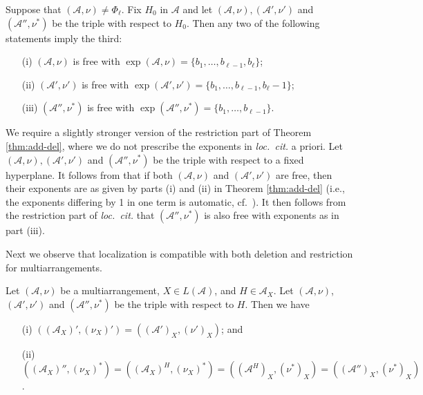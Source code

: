 \begin{theorem}
\label{thm:add-del}
Suppose that $({{\mathcal A}}, \nu) \ne \Phi_\ell$.
Fix $H_0$ in ${{\mathcal A}}$ and 
let  $({{\mathcal A}}, \nu), ({{\mathcal A}}', \nu')$ and  $({{\mathcal A}}'', \nu^*)$ be the triple with respect to $H_0$. 
Then any  two of the following statements imply the third:
\begin{itemize}
\item[(i)] $({{\mathcal A}}, \nu)$ is free with $\exp ({{\mathcal A}}, \nu) = \{ b_1, \ldots , b_{\ell -1}, b_\ell\}$;
\item[(ii)] $({{\mathcal A}}', \nu')$ is free with $\exp ({{\mathcal A}}', \nu') = \{ b_1, \ldots , b_{\ell -1}, b_\ell-1\}$;
\item[(iii)] $({{\mathcal A}}'', \nu^*)$ is free with $\exp ({{\mathcal A}}'', \nu^*) = \{ b_1, \ldots , b_{\ell -1}\}$.
\end{itemize}
\end{theorem}

\begin{remark}
\label{rem:restriction}
We require a 
slightly stronger version of the restriction part of 
Theorem \ref{thm:add-del}, where we 
do not prescribe the exponents in \emph{loc.\ cit.} a priori.
Let  $({{\mathcal A}}, \nu), ({{\mathcal A}}', \nu')$ and $({{\mathcal A}}'', \nu^*)$ 
be the triple with respect to a fixed hyperplane. 
It follows from \cite[Thm.\ 0.4]{abeteraowakefield:euler}
that if both $({{\mathcal A}}, \nu)$ and $({{\mathcal A}}', \nu')$ are free,
then their exponents are as given by parts (i) and (ii) in 
Theorem \ref{thm:add-del} 
(i.e., the exponents differing by 1 in one term is automatic,
cf.~\cite[Thm.\ 4.46]{orlikterao:arrangements}).
It then follows from the restriction part of \emph{loc.\ cit.}
that $({{\mathcal A}}'', \nu^*)$ is also free with exponents 
as in part (iii).
\end{remark}

Next we observe 
that localization is compatible 
with both deletion and restriction for multiarrangements. 

\begin{lemma}
\label{lem:euler}
Let $({{\mathcal A}}, \nu)$ be a multiarrangement, $X \in L({{\mathcal A}})$, and $H \in {{\mathcal A}}_X$.
Let $({{\mathcal A}}, \nu)$, $({{\mathcal A}}', \nu')$ and $({{\mathcal A}}'', \nu^*)$ be the triple 
with respect to $H$. Then we have 
\begin{itemize}
\item[(i)]
$(({{\mathcal A}}_X)', (\nu_X)') = (({{\mathcal A}}')_X, (\nu')_X)$; and 
\item[(ii)]
$(({{\mathcal A}}_X)'', (\nu_X)^*) = (({{\mathcal A}}_X)^H, (\nu_X)^*) = (({{\mathcal A}}^H)_X, (\nu^*)_X)
= (({{\mathcal A}}'')_X, (\nu^*)_X)$.
\end{itemize}
\end{lemma}

